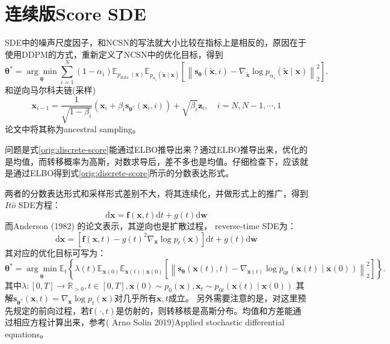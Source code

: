 


\section{连续版Score SDE}



SDE中的噪声尺度因子，和NCSN的写法就大小比较在指标上是相反的，原因在于使用DDPM的方式，重新定义了NCSN中的优化目标，得到
\begin{equation}
\label{orig:discrete-score}
\boldsymbol{\theta}^*=\underset{\boldsymbol{\theta}}{\arg \min } \sum_{i=1}^N\left(1-\alpha_i\right) \mathbb{E}_{p_{\text {data }}(\mathbf{x})} \mathbb{E}_{p_{\alpha_i}(\tilde{\mathbf{x}} \mid \mathbf{x})}\left[\left\|\mathbf{s}_{\boldsymbol{\theta}}(\tilde{\mathbf{x}}, i)-\nabla_{\tilde{\mathbf{x}}} \log p_{\alpha_i}(\tilde{\mathbf{x}} \mid \mathbf{x})\right\|_2^2\right] .
\end{equation}
和逆向马尔科夫链(采样)
\begin{equation}
\mathbf{x}_{i-1}=\frac{1}{\sqrt{1-\beta_i}}\left(\mathbf{x}_i+\beta_i \mathbf{s}_{\boldsymbol{\theta}^*}\left(\mathbf{x}_i, i\right)\right)+\sqrt{\beta_i} \mathbf{z}_i, \quad i=N, N-1, \cdots, 1
\end{equation}
论文中将其称为ancestral sampling。

问题是式\eqref{orig:discrete-score}能通过ELBO推导出来？通过ELBO推导出来，优化的是均值，而转移概率为高斯，对数求导后，差不多也是均值。仔细检查下，应该就是通过ELBO得到式\eqref{orig:discrete-score}所示的分数表达形式。

两者的分数表达形式和采样形式差别不大，将其连续化，并做形式上的推广，得到$It\hat{o}$ SDE方程：
\begin{equation}
\mathrm{d} \mathbf{x}=\mathbf{f}(\mathbf{x}, t) \mathrm{d} t+g(t) \mathrm{d} \mathbf{w}
\end{equation}
而Anderson (1982) 的论文表示，其逆向也是扩散过程， reverse-time SDE为：
\begin{equation}
\mathrm{d} \mathbf{x}=\left[\mathbf{f}(\mathbf{x}, t)-g(t)^2 \nabla_{\mathbf{x}} \log p_t(\mathbf{x})\right] \mathrm{d} t+g(t) \mathrm{d} \overline{\mathbf{w}}
\end{equation}
其对应的优化目标可写为：
\begin{equation}
\boldsymbol{\theta}^*=\underset{\boldsymbol{\theta}}{\arg \min } \mathbb{E}_t\left\{\lambda(t) \mathbb{E}_{\mathbf{x}(0)} \mathbb{E}_{\mathbf{x}(t) \mid \mathbf{x}(0)}\left[\left\|\mathbf{s}_{\boldsymbol{\theta}}(\mathbf{x}(t), t)-\nabla_{\mathbf{x}(t)} \log p_{0 t}(\mathbf{x}(t) \mid \mathbf{x}(0))\right\|_2^2\right]\right\} .
\end{equation}
其中$\lambda:[0, T] \rightarrow \mathbb{R}_{>0}, t\in [0, T], \mathbf{x}(0) \sim p_0(\mathbf{x}), \mathbf{x}_t \sim p_{0t}(\mathbf{x}(t) \mid \mathbf{x}(0))$
其解$\mathbf{s}_{\boldsymbol{\theta}^*}\left(\mathbf{x}, t\right)=\nabla_{\mathbf{x}} \log p_{t}(\mathbf{x})$对几乎所有$\mathbf{x}, t$成立。
另外需要注意的是，对这里预先规定的前向过程，若$\mathbf{f}(\cdot, t)$是仿射的，则转移核是高斯分布。均值和方差能通过相应方程计算出来，参考( Arno Solin 2019)Applied stochastic differential equations。

